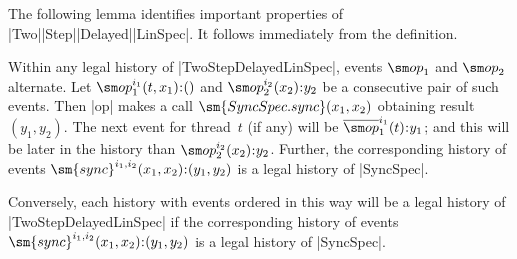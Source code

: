 The following lemma identifies important properties of
|Two|\-|Step|\-|Delayed|\-|LinSpec|.  It follows immediately from the
definition.
%
\begin{lemma}
\label{lem:TwoStepLinSpec-histories}
Within any legal history of |TwoStepDelayedLinSpec|, events $\op_1$ and
$\op_2$ alternate.  Let $\op_1^{i_1}(t,x_1) \:: ()$ and $\op_2^{i_2}(x_2) \::
y_2$ be a consecutive pair of such events.  Then |op| makes a call
$\sm{SyncSpec.sync}(x_1, x_2)$ obtaining result $(y_1,y_2)$.  The next event
for thread~$t$ (if any) will be $\overline\op_1^{i_1}(t) \:: y_1$; and this
will be later in the history than $\op_2^{i_2}(x_2) \:: y_2$.  Further, the
corresponding history of events $\sm{sync}^{i_1,i_2}(x_1,x_2) \:: (y_1,y_2)$
is a legal history of |SyncSpec|.

Conversely, each history with events ordered in this way will be a legal
history of |TwoStepDelayedLinSpec| if  the corresponding history
of events $\sm{sync}^{i_1,i_2}(x_1,x_2) \:: (y_1,y_2)$ is a legal history of
|SyncSpec|.
\end{lemma}


